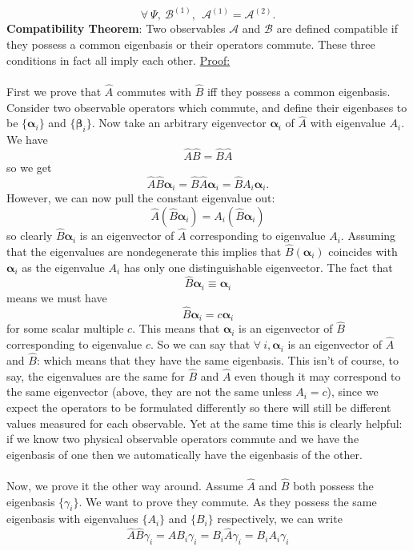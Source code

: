 $$
\forall\:\Psi,\:\mathcal{B}^{(1)},\:\:\mathcal{A}^{(1)}=\mathcal{A}^{(2)}.
$$
\textbf{Compatibility Theorem}: Two observables $\mathcal{A}$ and $\mathcal{B}$ are defined compatible if they possess a common eigenbasis or their operators commute. These three conditions in fact all imply each other.
\underline{Proof:}
\\\\
First we prove that $\hat{A}$ commutes with $\hat{B}$ iff they possess a common eigenbasis. Consider two observable operators which commute, and define their eigenbases to be $\{\bm{\alpha}_{i}\}$ and $\{\bm{\beta}_{i}\}$. Now take an arbitrary eigenvector $\bm{\alpha}_{i}$ of $\hat{A}$ with eigenvalue $A_{i}$. We have
$$
\hat{A}\hat{B}=\hat{B}\hat{A}
$$
so we get 
$$
\hat{A}\hat{B}\bm{\alpha}_{i}=\hat{B}\hat{A}\bm{\alpha}_{i}=\hat{B}A_{i}\bm{\alpha}_{i}.
$$
However, we can now pull the constant eigenvalue out:
$$
\hat{A}(\hat{B}\bm{\alpha}_{i})=A_{i}(\hat{B}\bm{\alpha}_{i})
$$
so clearly $\hat{B}\bm{\alpha}_{i}$ is an eigenvector of $\hat{A}$ corresponding to eigenvalue $A_{i}$. Assuming that the eigenvalues are nondegenerate this implies that $\hat{B}(\bm{\alpha}_{i})$ coincides with $\bm{\alpha}_{i}$ as the eigenvalue $A_{i}$ has only one distinguishable eigenvector. The fact that 
$$
\hat{B}\bm{\alpha}_{i}\equiv\bm{\alpha}_{i}
$$
means we must have
$$
\hat{B}\bm{\alpha}_{i}=c\bm{\alpha}_{i}
$$
for some scalar multiple $c$. This means that $\bm{\alpha}_{i}$ is an eigenvector of $\hat{B}$ corresponding to eigenvalue $c$. So we can say that $\forall\:i, \bm{\alpha}_{i}$ is an eigenvector of $\hat{A}$ and $\hat{B}$: which means that they have the same eigenbasis. This isn't of course, to say, the eigenvalues are the same for $\hat{B}$ and $\hat{A}$ even though it may correspond to the same eigenvector (above, they are not the same unless $A_{i}=c$), since we expect the operators to be formulated differently so there will still be different values measured for each observable. Yet at the same time this is clearly helpful: if we know two physical observable operators commute and we have the eigenbasis of one then we automatically have the eigenbasis of the other. 
\\\\
Now, we prove it the other way around. Assume $\hat{A}$ and $\hat{B}$ both possess the eigenbasis $\{\gamma_{i}\}$. We want to prove they commute. As they possess the same eigenbasis with eigenvalues $\{A_{i}\}$ and $\{B_{i}\}$ respectively, we can write
$$
\hat{A}\hat{B}\gamma_{i}=\hat{A}B_{i}\gamma_{i}=B_{i}\hat{A}\gamma_{i}=B_{i}A_{i}\gamma_{i}
$$
